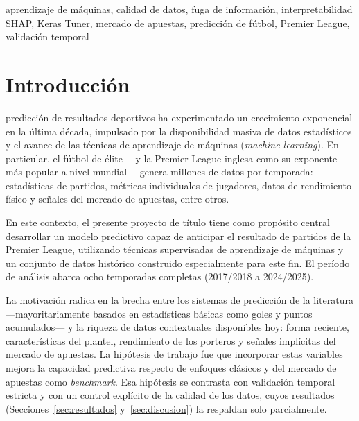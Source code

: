 \documentclass{ieeeaccess}
\begin{document}
\begin{keywords}
aprendizaje de máquinas, calidad de datos, fuga de información, interpretabilidad SHAP, Keras Tuner, mercado de apuestas, predicción de fútbol, Premier League, validación temporal
\end{keywords}

\titlepgskip=-15pt

\maketitle

\section{Introducción}
\label{sec:introduction}
 predicción de resultados deportivos ha experimentado un crecimiento exponencial en la última década, impulsado por la disponibilidad masiva de datos estadísticos y el avance de las técnicas de aprendizaje de máquinas (\textit{machine learning}). En particular, el fútbol de élite ---y la Premier League inglesa como su exponente más popular a nivel mundial--- genera millones de datos por temporada: estadísticas de partidos, métricas individuales de jugadores, datos de rendimiento físico y señales del mercado de apuestas, entre otros.

En este contexto, el presente proyecto de título tiene como propósito central desarrollar un modelo predictivo capaz de anticipar el resultado de partidos de la Premier League, utilizando técnicas supervisadas de aprendizaje de máquinas y un conjunto de datos histórico construido especialmente para este fin. El período de análisis abarca ocho temporadas completas (2017/2018 a 2024/2025).

La motivación radica en la brecha entre los sistemas de predicción de la literatura ---mayoritariamente basados en estadísticas básicas como goles y puntos acumulados--- y la riqueza de datos contextuales disponibles hoy: forma reciente, características del plantel, rendimiento de los porteros y señales implícitas del mercado de apuestas. La hipótesis de trabajo fue que incorporar estas variables mejora la capacidad predictiva respecto de enfoques clásicos y del mercado de apuestas como \textit{benchmark}. Esa hipótesis se contrasta con validación temporal estricta y con un control explícito de la calidad de los datos, cuyos resultados (Secciones~\ref{sec:resultados} y~\ref{sec:discusion}) la respaldan solo parcialmente.
\end{document}

